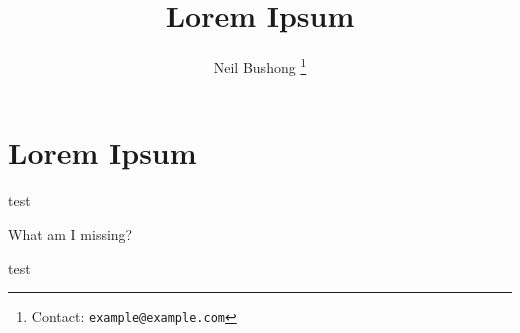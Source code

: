 \documentclass[11pt]{article}
\title{Lorem Ipsum}
\author{Neil Bushong
  \footnote{Contact: \texttt{example@example.com}}
}
\begin{document}
\maketitle

\begin{abstract}
\lipsum[1]
\end{abstract}


\section{Lorem Ipsum} \label{sec:tmp}

\lipsum[1]

test

What am I missing?

test


%
%
%
\end{document}
